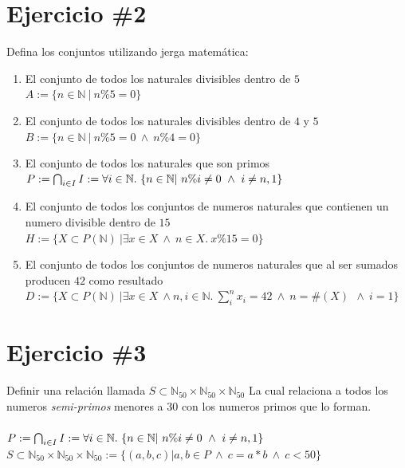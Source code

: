 \documentclass{article}
\begin{document}
\section*{Ejercicio \#2}
Defina los conjuntos utilizando jerga matemática:
\begin{enumerate}
        \item{El conjunto de todos los naturales divisibles dentro de $5$}\\
        $A:=\{n\in \mathbb{N}\ | \ n\%5=0 \}$
        \item{El conjunto de todos los naturales divisibles dentro de $4$ y $5$}\\
        $B:=\{n\in \mathbb{N}\ | \ n\%5=0\ \wedge \ n\%4=0 \}$
        \item{El conjunto de todos los naturales que son primos}\\
         $P:=\bigcap_{i\in I}\ \\I:=\forall i\in\mathbb{N}. \  \{n\in\mathbb{N}| \ n\%i\neq 0 \ \wedge \ i\neq n,1\}$
        \item{El conjunto de todos los conjuntos de numeros naturales que contienen un numero divisible dentro de $15$}\\
         $H:=\{X \subset P(\mathbb{N})\ |\exists x \in X  \ \wedge \ n \in X. \ x \%15=0 \}$
        \item{El conjunto de todos los conjuntos de numeros naturales que al ser sumados
        producen $42$ como resultado}
        \\
        $D:=\{X \subset P(\mathbb{N})\ |\exists x \in X \ \wedge n, i\in \mathbb{N}. \ \sum_i^n x_i = 42 \ \wedge \ n = \#(X)\ \ \wedge \ i=1\}$
\end{enumerate}
\section*{Ejercicio \#3}
Definir una relación llamada $S\subset \mathbb{N}_{50}\times\mathbb{N}_{50}\times\mathbb{N}_{50}$ La cual relaciona a todos los numeros
\emph{semi-primos} menores a $30$ con los numeros primos que lo forman. \\\\
$P:=\bigcap_{i\in I}\ \\I:=\forall i\in\mathbb{N}. \  \{n\in\mathbb{N}| \ n\%i\neq 0 \ \wedge \ i\neq n,1\}$\\

$S\subset \mathbb{N}_{50}\times\mathbb{N}_{50}\times\mathbb{N}_{50}:=\{(a, b, c)| a,b \in P \ \wedge \ c=a*b \ \wedge \ c<50\}$\\
\end{document}
